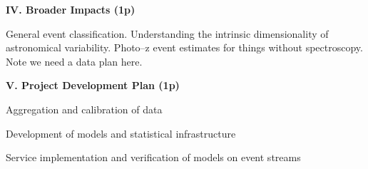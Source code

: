  \smallskip

 \smallskip

\bigskip \centerline{\bf IV. Broader Impacts (1p)} \smallskip {}

General event classification.  Understanding the intrinsic dimensionality of
astronomical variability. Photo--z event estimates for things without
spectroscopy.  Note we need a data plan here.

\bigskip \centerline{\bf V. Project Development Plan (1p)} \smallskip

 \smallskip

Aggregation and calibration of data

 \smallskip

Development of models and statistical infrastructure

 \smallskip

Service implementation and verification of models on event streams

